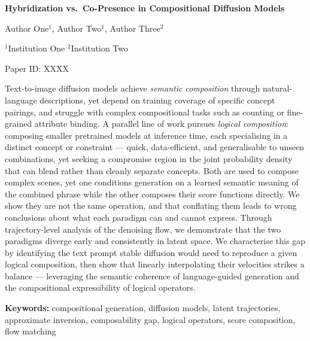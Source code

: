 \documentclass{article}
\begin{document}
\begin{center}
  {\large\textbf{Hybridization vs.\ Co-Presence in Compositional Diffusion Models}}

  \medskip
  {\normalsize Author One$^1$, Author Two$^1$, Author Three$^2$}

  \smallskip
  {\small $^1$Institution One \quad $^2$Institution Two}

  \smallskip
  {\small Paper ID: XXXX}
\end{center}

\bigskip

Text-to-image diffusion models achieve \emph{semantic composition}
through natural-language descriptions, yet depend on training coverage
of specific concept pairings, and struggle with complex compositional
tasks such as counting or fine-grained attribute binding.
A parallel line of work pursues \emph{logical composition}: composing
smaller pretrained models at inference time, each specialising in a
distinct concept or constraint --- quick, data-efficient, and
generalisable to unseen combinations, yet seeking a compromise region
in the joint probability density that can blend rather than cleanly
separate concepts.
Both are used to compose complex scenes, yet one conditions generation
on a learned semantic meaning of the combined phrase while the other
composes their score functions directly.
We show they are not the same operation, and that conflating them
leads to wrong conclusions about what each paradigm can and cannot express.
Through trajectory-level analysis of the denoising flow, we demonstrate
that the two paradigms diverge early and consistently in latent space.
We characterise this gap by identifying the text prompt stable diffusion
would need to reproduce a given logical composition, then show that
linearly interpolating their velocities strikes a balance --- leveraging
the semantic coherence of language-guided generation and the
compositional expressibility of logical operators.

\bigskip
\noindent\textbf{Keywords:} compositional generation, diffusion models,
latent trajectories, approximate inversion, composability gap,
logical operators, score composition, flow matching
\end{document}
